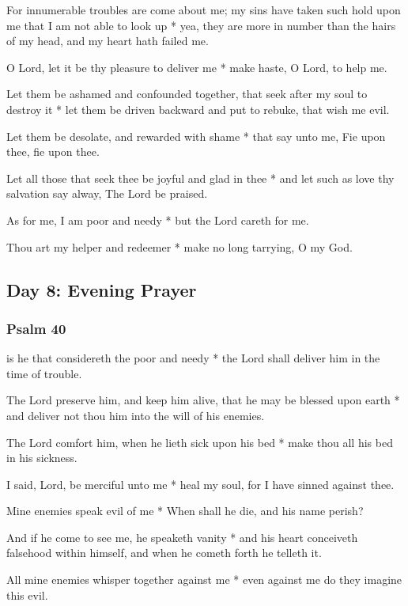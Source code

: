 For innumerable troubles are come about me; my sins have taken such hold upon me that I am not able to look up * yea, they are more in number than the hairs of my head, and my heart hath failed me.

O Lord, let it be thy pleasure to deliver me * make haste, O Lord, to help me.

Let them be ashamed and confounded together, that seek after my soul to destroy it * let them be driven backward and put to rebuke, that wish me evil.

Let them be desolate, and rewarded with shame * that say unto me, Fie upon thee, fie upon thee.

Let all those that seek thee be joyful and glad in thee * and let such as love thy salvation say alway, The Lord be praised.

As for me, I am poor and needy * but the Lord careth for me.

Thou art my helper and redeemer * make no long tarrying, O my God.

\subsection{Day 8: Evening Prayer}

\subsubsection{Psalm 40}


 is he that considereth the poor and needy * the Lord shall deliver him in the time of trouble.

The Lord preserve him, and keep him alive, that he may be blessed upon earth * and deliver not thou him into the will of his enemies.

The Lord comfort him, when he lieth sick upon his bed * make thou all his bed in his sickness.

I said, Lord, be merciful unto me * heal my soul, for I have sinned against thee.

Mine enemies speak evil of me * When shall he die, and his name perish?

And if he come to see me, he speaketh vanity * and his heart conceiveth falsehood within himself, and when he cometh forth he telleth it.

All mine enemies whisper together against me * even against me do they imagine this evil.

